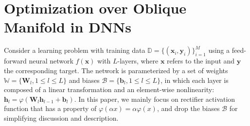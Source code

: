 \documentclass[twocolumn]{article}
\begin{document}
%
%
%
%
%
%




\section{Optimization over Oblique Manifold in DNNs}

Consider a learning problem with training data $\mathbb{D}=\{(\mathbf{x}_i, \mathbf{y}_i)\}_{i=1}^{M}$ using a feed-forward neural network $f(\mathbf{x})$ with $L$-layers, where $\mathbf{x}$ refers to the input and $\mathbf{y}$ the corresponding target. The network is parameterized by a set of weights $\mathbb{W}=\{ \mathbf{W}_{l}, 1\leq l \leq {L} \}$ and biases $\mathcal{B}=\{ \mathbf{b}_{l}, 1 \leq l \leq {L} \}$, in which each layer is composed of a linear transformation and an element-wise nonlinearity: $\mathbf{h}_l=\varphi(\mathbf{W}_{l} \mathbf{h}_{l-1}+ \mathbf{b}_l) $. In this paper, we mainly focus on rectifier activation function that has a property of $\varphi(\alpha x)=\alpha \varphi(x)$, and drop the biases $\mathcal{B}$ for simplifying discussion and description.
\end{document}
